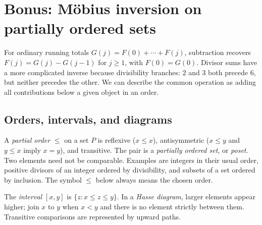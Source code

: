 \section{Bonus: M\"obius inversion on partially ordered sets}
\label{sec:poset-inversion}

For ordinary running totals $G(j)=F(0)+\cdots+F(j)$, subtraction
recovers $F(j)=G(j)-G(j-1)$ for $j\ge1$, with $F(0)=G(0)$.
Divisor sums have a more complicated inverse because divisibility
branches: $2$ and $3$ both precede $6$, but neither precedes the other.
We can describe the common operation as adding all contributions
below a given object in an order.

\subsection{Orders, intervals, and diagrams}

A \emph{partial order} $\le$ on a set $P$ is reflexive
($x\le x$), antisymmetric ($x\le y$ and $y\le x$ imply $x=y$),
and transitive. The pair is a \emph{partially ordered set}, or
\emph{poset}. Two elements need not be comparable.
Examples are integers in their usual order, positive divisors of
an integer ordered by divisibility, and subsets of a set ordered
by inclusion. The symbol $\le$ below always means the chosen order.

The \emph{interval} $[x,y]$ is $\{z:x\le z\le y\}$.
In a \emph{Hasse diagram}, larger elements appear higher; join $x$
to $y$ when $x<y$ and there is no element strictly between them.
Transitive comparisons are represented by upward paths.

\begin{center}
\end{center}

